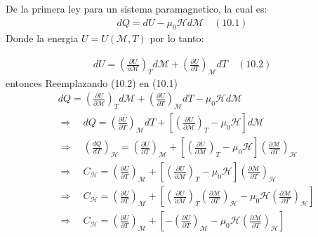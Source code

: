 \documentclass[a4paper]{article}
\begin{document}
    
    \begin{answer}
        De la primera ley para un sistema paramagnetico, la cual es:
        \begin{align*}
            dQ = dU - \mu_0 \mathscr{H} d\mathscr{M} \quad (10.1)
        \end{align*}
        Donde la energia $U= U(\mathscr{M}, T)$ por lo tanto:

        \begin{align*}
            dU = \left(\frac{\partial U}{\partial \mathscr{M}}\right)_T d\mathscr{M} + \left(\frac{\partial U}{\partial T}\right)_{\mathscr{M}} dT \quad (10.2)
        \end{align*}
        entonces Reemplazando (10.2) en (10.1)
        \begin{align*}
            &dQ = \left(\frac{\partial U}{\partial \mathscr{M}}\right)_T d\mathscr{M} + \left(\frac{\partial U}{\partial T}\right)_{\mathscr{M}} dT - \mu_0 \mathscr{H} d\mathscr{M} \\
            &\Rightarrow \quad  dQ = \left(\frac{\partial U}{\partial T}\right)_{\mathscr{M}} dT + \left[\left(\frac{\partial U}{\partial \mathscr{M}}\right)_T - \mu_0 \mathscr{H} \right] d\mathscr{M}\\
            &\Rightarrow \quad  \left(\frac {dQ}{dT}\right)_{\mathscr{H}}  = \left(\frac{\partial U}{\partial T}\right)_{\mathscr{M}} + \left[\left(\frac{\partial U}{\partial \mathscr{M}}\right)_T - \mu_0 \mathscr{H} \right] \left(\frac{\partial \mathscr{M}}{\partial T}\right)_{\mathscr{H}}\\
            &\Rightarrow \quad C_{\mathscr{H}} = \left(\frac{\partial U}{\partial T}\right)_{\mathscr{M}} + \left[\left(\frac{\partial U}{\partial \mathscr{M}}\right)_T - \mu_0 \mathscr{H} \right] \left(\frac{\partial \mathscr{M}}{\partial T}\right)_{\mathscr{H}} \\ 
            &\Rightarrow \quad C_{\mathscr{H}} = \left(\frac{\partial U}{\partial T}\right)_{\mathscr{M}} + \left[\left(\frac{\partial U}{\partial \mathscr{M}}\right)_T  \left(\frac{\partial \mathscr{M}}{\partial T}\right)_{\mathscr{H}} - \mu_0 \mathscr{H}  \left(\frac{\partial \mathscr{M}}{\partial T}\right)_{\mathscr{H}} \right] \\
            &\Rightarrow \quad C_{\mathscr{H}} = \left(\frac{\partial U}{\partial T}\right)_{\mathscr{M}} + \left[-\left(\frac{\partial U}{\partial T}\right)_{\mathscr{M}}  - \mu_0 \mathscr{H}  \left(\frac{\partial \mathscr{M}}{\partial T}\right)_{\mathscr{H}} \right] \\  

\end{align*}
\end{answer}
\end{document}
